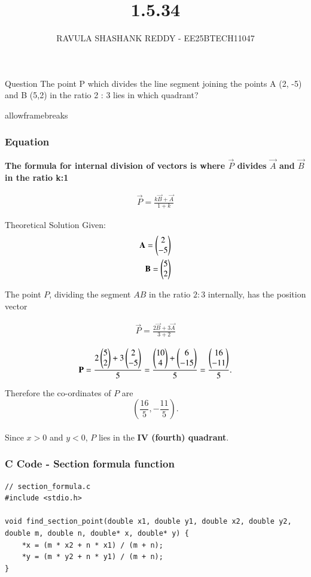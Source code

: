 \documentclass{beamer}
\title %
{1.5.34}
\author %
{RAVULA SHASHANK REDDY - EE25BTECH11047}
\begin{document}
	
	
	\frame{\titlepage}
	\begin{frame}{Question}
		The point P which divides the line segment joining the points A (2, -5)
		and B (5,2) in the ratio 2 : 3 lies in which quadrant?
	\end{frame}
	\begin{frame}{allowframebreaks}
		\frametitle{Equation}
	\textbf{The formula for internal division of vectors is where $\vec{P}$ divides $\vec{A}$ and $\vec{B}$ in the ratio k:1}
		\centering
		
		\label{tab:parameters}
		\begin{align*}
			\vec{P} =	\frac{k\vec{B} + \vec{A}}{1+k} 
		\end{align*}
		\end{frame}	
	
	\begin{frame}{Theoretical Solution}
    Given:
\begin{align}
\mathbf{A} = \begin{pmatrix}2 \\ -5\end{pmatrix} \\ \mathbf{B} = \begin{pmatrix}5 \\ 2\end{pmatrix}
\end{align}

The point \(P\), dividing the segment \(AB\) in the ratio \(2:3\) internally, has the position vector

\begin{align}
\vec{P} = \frac{2 \vec{B} + 3\vec{A}}{3 + 2} 
\end{align}

	
\end{frame}

\begin{frame}[fragile]
	\begin{align}
	\mathbf{P}= \frac{2 \begin{pmatrix}5 \\ 2\end{pmatrix} + 3\begin{pmatrix}2 \\ -5\end{pmatrix}}{5} = \frac{\begin{pmatrix}10 \\ 4\end{pmatrix} + \begin{pmatrix}6 \\ -15\end{pmatrix}}{5} = \frac{\begin{pmatrix}16 \\ -11\end{pmatrix}}{5}.
\end{align}

Therefore the co-ordinates of \(P\) are \[
\left(\dfrac{16}{5}, -\dfrac{11}{5}\right).
\]
\\
Since \(x>0\) and \(y<0\), \(P\) lies in the \textbf{IV (fourth) quadrant}.

\end{frame}
	
	\begin{frame}[fragile]
		\frametitle{C Code - Section formula function }
		
		\begin{lstlisting}
// section_formula.c
#include <stdio.h>

void find_section_point(double x1, double y1, double x2, double y2, double m, double n, double* x, double* y) {
	*x = (m * x2 + n * x1) / (m + n);
	*y = (m * y2 + n * y1) / (m + n);
}
			\end{lstlisting}
		\end{frame}
\end{document}

